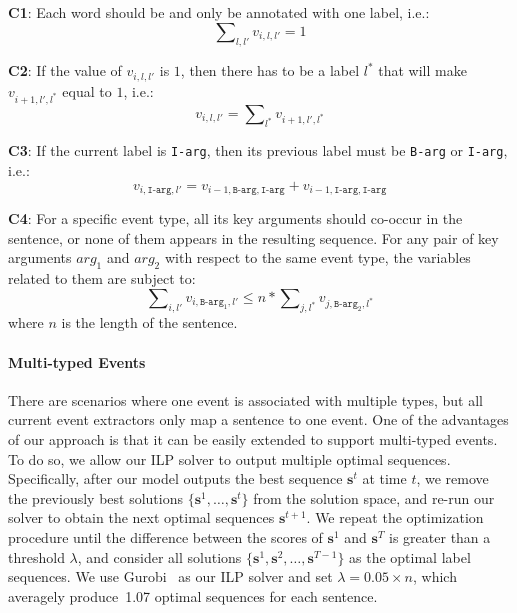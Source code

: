 \textbf{C1}: Each word should be and only be annotated with one label, i.e.:
\begin{equation}
	\sum\nolimits_{l,l'}v_{i,l,l'}=1
\end{equation}

\textbf{C2}: If the value of $v_{i,l,l'}$ is $1$, then there has to be a label $l^*$ that will make $v_{i+1,l',l^*}$ equal to $1$, i.e.:
\begin{equation}
	v_{i,l,l'} = \sum\nolimits_{l^*}v_{i+1,l',l^*}
\end{equation}

\textbf{C3}: If the current label is \texttt{I-arg}, then its previous label must be \texttt{B-arg} or \texttt{I-arg}, i.e.:
\begin{equation}
	v_{i,\texttt{I-arg},l'} = v_{i-1,\texttt{B-arg},\texttt{I-arg}} + v_{i-1, \texttt{I-arg}, \texttt{I-arg}}
\end{equation}

\textbf{C4}: For a specific event type, all its key arguments should co-occur in the sentence, or none of them appears in the resulting sequence. For any pair of key arguments $arg_1$ and $arg_2$ with respect to the same event type, the variables related to them are subject to:
\begin{equation}
	\sum\nolimits_{i,l'}{v_{i,\texttt{B-arg}_1,l'}} \leq n * \sum\nolimits_{j,l^*}{v_{j,\texttt{B-arg}_2,l^*}}
\end{equation}
where $n$ is the length of the sentence.

\paragraph{Multi-typed Events}
There are scenarios where one event is associated with multiple types, but all current event extractors only map a sentence to one event.
 One of the advantages of our approach is that it can be easily extended to support multi-typed events.
To do so, we allow our ILP solver to output multiple optimal sequences. Specifically, after our model outputs the best sequence $\bm{s}^t$
at time $t$, we remove the previously best solutions
 $\{\bm{s}^1, \ldots, \bm{s}^{t}\}$ from the solution space, and re-run our solver to obtain the next optimal sequences $\bm{s}^{t+1}$.
We repeat the optimization procedure until the difference between the scores of $\bm{s}^1$ and $\bm{s}^T$ is greater
than a threshold $\lambda$, and consider all solutions $\{\bm{s}^1, \bm{s}^2, \ldots, \bm{s}^{T-1}\}$ as the optimal label sequences.
We use Gurobi~\cite{gurobi} as our ILP solver and set $\lambda=0.05 \times n$, which averagely produce~1.07 optimal sequences for each sentence.


